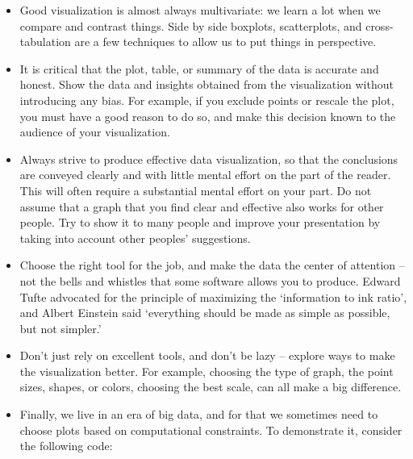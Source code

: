 \begin{itemize}
\item Good visualization is almost always multivariate: we learn a lot when we
  compare and contrast things. Side by side boxplots, scatterplots, and
  cross-tabulation are a few techniques to allow us to put things in
  perspective.

\item It is critical that the plot, table, or summary of the data is accurate
  and honest. Show the data and insights obtained from the visualization without
  introducing any bias. For example, if you exclude points or rescale the plot,
  you must have a good reason to do so, and make this decision known to the
  audience of your visualization.

\item Always strive to produce effective data visualization, so that the
  conclusions are conveyed clearly and with little mental effort on the part of
  the reader. This will often require a substantial mental effort on your
  part. Do not assume that a graph that you find clear and effective also works
  for other people. Try to show it to many people and improve your presentation
  by taking into account other peoples' suggestions.

\item Choose the right tool for the job, and make the data the center of
  attention -- not the bells and whistles that some software allows you to
  produce. Edward Tufte \citep{Tufte:VisuDispQuanInfo2001} advocated for the
principle of maximizing the `information to ink ratio', and Albert Einstein
said
  `everything should be made as simple as possible, but not simpler.'

\item Don't just rely on excellent tools, and don't be lazy -- explore ways to
  make the visualization better. For example, choosing the type of graph, the
  point sizes, shapes, or colors, choosing the best scale, can all make a big
  difference.

\item Finally, we live in an era of big data, and for that we sometimes need to
  choose plots based on computational constraints. To demonstrate it, consider
  the following code:


\end{itemize}
